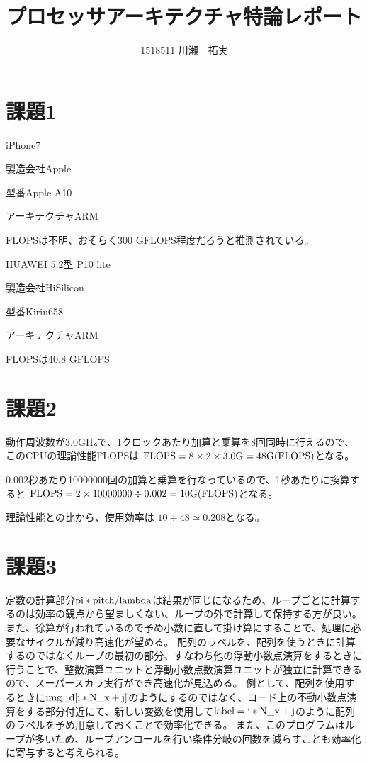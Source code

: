 \documentclass{jsarticle}
\begin{document}
\title{プロセッサアーキテクチャ特論レポート}
\author{1518511 川瀬　拓実}
\maketitle

\newpage

\section{課題1}
iPhone7

製造会社Apple

型番Apple A10

アーキテクチャARM

FLOPSは不明、おそらく300 GFLOPS程度だろうと推測されている。


HUAWEI 5.2型 P10 lite

製造会社HiSilicon

型番Kirin658

アーキテクチャARM

FLOPSは40.8 GFLOPS

\section{課題2}
動作周波数が3.0GHzで、1クロックあたり加算と乗算を8回同時に行えるので、このCPUの理論性能FLOPSは
$\rm{FLOPS} = 8 \times 2 \times 3.0\rm{G} = 48\rm{G(FLOPS)}$となる。

0.002秒あたり10000000回の加算と乗算を行なっているので、1秒あたりに換算すると
$\rm{FLOPS} = 2 \times 10000000 \div 0.002 = 10\rm{G(FLOPS)}$となる。

理論性能との比から、使用効率は
$10 \div 48 \simeq 0.208$となる。

\section{課題3}
定数の計算部分$\rm{pi * pitch / lambda}$は結果が同じになるため、ループごとに計算するのは効率の観点から望ましくない、ループの外で計算して保持する方が良い。また、徐算が行われているので予め小数に直して掛け算にすることで、処理に必要なサイクルが減り高速化が望める。
配列のラベルを、配列を使うときに計算するのではなくループの最初の部分、すなわち他の浮動小数点演算をするときに行うことで、整数演算ユニットと浮動小数点数演算ユニットが独立に計算できるので、スーパースカラ実行ができ高速化が見込める。
例として、配列を使用するときに$\rm{img\_d[i*N\_x + j]}$のようにするのではなく、コード上の不動小数点演算をする部分付近にて、新しい変数を使用して$\rm{label = i * N\_x +j}$のように配列のラベルを予め用意しておくことで効率化できる。
また、このプログラムはループが多いため、ループアンロールを行い条件分岐の回数を減らすことも効率化に寄与すると考えられる。
\end{document}
